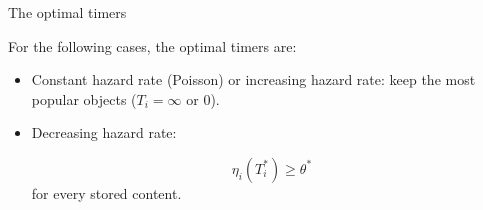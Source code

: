 \documentclass[aspectratio=169]{beamer}
\begin{document}
\begin{frame}{The optimal timers}

	\begin{theorem}
		For the following cases, the optimal timers are:

		\begin{itemize}
			\item Constant hazard rate (Poisson) or increasing hazard rate: keep the most popular objects ($T_i=\infty$ or $0$).
			
			\item Decreasing hazard rate:
			
			\begin{equation*}
				\eta_i (T_i^*) \geqslant \theta^*
			   \end{equation*}
			  for every stored content.
		\end{itemize}
	\end{theorem}
	\pause
	\vfill
\end{frame}
\end{document}
